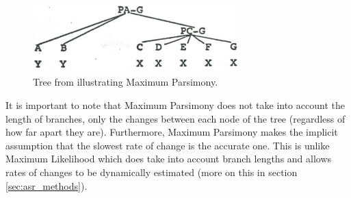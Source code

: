 \documentclass[a4paper,10pt]{article} %
\begin{document}
\begin{figure}[h]
\centering
\includegraphics[width=8cm]{illustrations/Clark_1977_tree.png}
\caption{{Tree from \citet[19]{clark1976aspects} illustrating Maximum Parsimony.}}
\label{fig:clark_tree}
\end{figure}

It is important to note that Maximum Parsimony does not take into account the length of branches, only the changes between each node of the tree (regardless of how far apart they are). Furthermore, Maximum Parsimony makes the implicit assumption that the slowest rate of change is the accurate one. This is unlike Maximum Likelihood which does take into account branch lengths and allows rates of changes to be dynamically estimated (more on this in section \ref{sec:asr_methods}).


\end{document}
